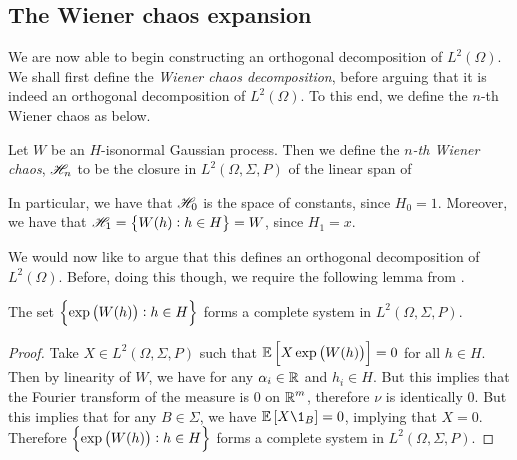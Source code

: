 \documentclass[../main.tex]{subfiles}
\begin{document}
\subsection{The Wiener chaos expansion}
We are now able to begin constructing an orthogonal decomposition of $L^2(\Omega)$. We shall first define the \emph{Wiener chaos decomposition}, before arguing that it is indeed an orthogonal decomposition of $L^2(\Omega)$. To this end, we define the $n$-th Wiener chaos as below.
\begin{definition}
\label{def:n_wiener_chaos}
Let $W$ be an $H$-isonormal Gaussian process. Then we define the \emph{$n$-th Wiener chaos}, $\mathscr{H}_n$ to be the closure in $L^2(\Omega,\Sigma,P)$ of the linear span of 
\end{definition}
In particular, we have that $\mathscr{H}_0$ is the space of constants, since $H_0 = 1$. Moreover, we have that $\Wie_1 = \cbr{W(h):h\in H} = W$, since $H_1 = x$.

We would now like to argue that this defines an orthogonal decomposition of $L^2(\Omega)$. Before, doing this though, we require the following lemma from \cite{Nualart2006}.
\begin{lemma}
\label{lem:complete_system}
The set $\cbr{\exp\del{W(h)}:h\in H}$ forms a complete system in $L^2(\Omega,\Sigma,P)$.
\end{lemma}
\begin{proof}
Take $X\in L^2(\Omega,\Sigma,P)$ such that $\Ex\sbr{X\exp\del{W(h)}} = 0$ for all $h\in H$. Then by linearity of $W$, we have  for any $\alpha_i\in\operatorname{\mathbb{R}}$ and $h_i\in H$. But this implies that the Fourier transform of the measure  is $0$ on $\operatorname{\mathbb{R}}^m$, therefore $\nu$ is identically $0$. But this implies that for any $B\in\Sigma$, we have $\Ex\sbr{X\1_B} = 0$, implying that $X = 0$. Therefore $\cbr{\exp\del{W(h)}:h\in H}$ forms a complete system in $L^2(\Omega,\Sigma,P)$.
\end{proof}
\end{document}
